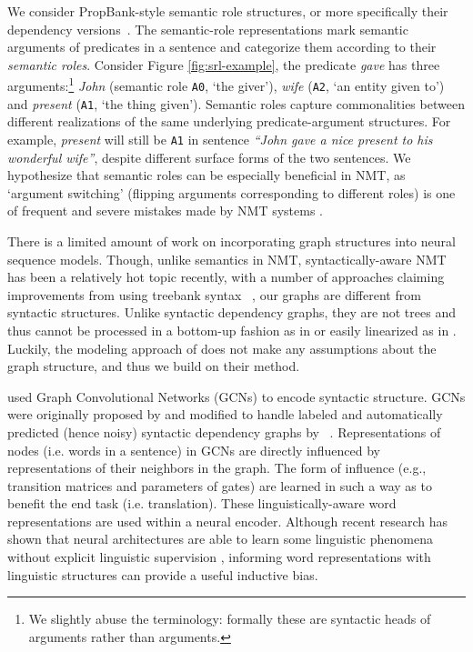\documentclass[11pt,a4paper]{article}
\begin{document}
We consider PropBank-style \cite{DBLP:journals/coling/PalmerKG05} semantic role structures, or more specifically their dependency versions~\cite{DBLP:conf/conll/SurdeanuJMMN08}. 
The semantic-role representations mark semantic arguments of predicates in a sentence and categorize them according  to their {\it semantic roles}. 
Consider Figure \ref{fig:srl-example}, the predicate {\it gave} has three arguments:\footnote{We slightly abuse the terminology: formally these are syntactic heads of arguments rather than arguments.} \textit{John} (semantic role {\tt A0}, `the giver'), \textit{wife} (\texttt{A2}, `an entity given to') and \textit{present} (\texttt{A1}, `the thing given'). Semantic roles capture commonalities between different realizations of the same underlying predicate-argument structures. 
For example, {\it present} will still be {\tt A1} in sentence {\it``John gave a nice present to his wonderful wife''}, despite different surface 
forms of the two sentences. We hypothesize that semantic roles can be especially beneficial in NMT, as `argument switching' (flipping arguments corresponding to different roles) is one of frequent and severe mistakes made by NMT systems \cite{DBLP:conf/emnlp/IsabelleCF17}.

There is a limited amount of work on incorporating graph structures into neural sequence models. 
Though, unlike semantics in NMT, syntactically-aware NMT has been a relatively hot topic recently, with a number of approaches claiming improvements from using treebank syntax ~\cite{sennrich2016linguistic,eriguchi2016treetoseq,DBLP:conf/wmt/NadejdeRSDJKB17,bastings-EtAl:2017:EMNLP2017,aharonigoldberg2017stringtotree}, our graphs are different from syntactic structures. Unlike syntactic dependency graphs, they are not trees and thus cannot be processed in a bottom-up fashion as in  or easily linearized as in . Luckily, the modeling approach of  does not make any assumptions about the graph structure, and thus we build on their method.


 used Graph Convolutional Networks (GCNs) to encode syntactic structure. GCNs were originally proposed by 
  and  modified to handle labeled and automatically predicted (hence noisy) syntactic dependency graphs by ~. Representations of nodes (i.e. words in a sentence) in GCNs are directly influenced by representations of their neighbors in the graph. The form of influence (e.g., transition matrices and parameters of gates) are learned in such a way as to benefit the end task (i.e. translation). These linguistically-aware word representations are used within a neural encoder.  Although recent research has shown that neural architectures are able to learn some linguistic phenomena without explicit linguistic supervision \cite{linzen-dupoux-goldberg:2016:tacllstmsyntax,NIPS2017_7181}, informing word representations with linguistic structures can provide a useful inductive bias.
\end{document}
